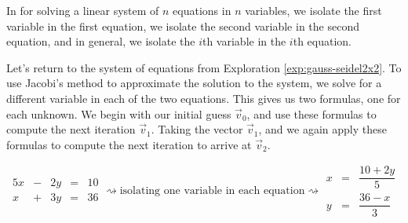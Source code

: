\documentclass{ximera}
\begin{document}
In  for solving a linear system of $n$ equations in $n$ variables, we isolate the first variable in the first equation, we isolate the second variable in the second equation, and in general, we isolate the $i$th variable in the $i$th equation.

Let's return to the system of equations from Exploration \ref{exp:gauss-seidel2x2}.  To use Jacobi's method to approximate the solution to the system, we solve for a different variable in each of the two equations.  This gives us two formulas, one for each unknown.  We begin with our initial guess $\vec{v}_0$, and use these formulas to compute the next iteration $\vec{v}_1$.  Taking the vector $\vec{v}_1$, and we again apply these formulas to compute the next iteration to arrive at $\vec{v}_2$.


\begin{equation*}\begin{array}{ccccc}
      5x& -&2y&=&10\\
      x & +&3y&= &36 
    \end{array}
\rightsquigarrow\text{isolating one variable in each equation}\rightsquigarrow
\begin{array}{ccc}
      x& =&\dfrac{10+2y}{5}\\
      y& =&\dfrac{36-x}{3}
    \end{array}
\end{equation*}
\end{document}
